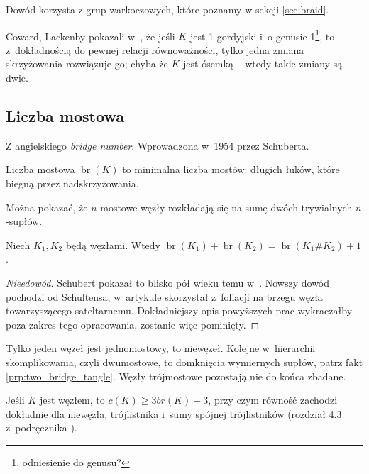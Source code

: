 Dowód korzysta z grup warkoczowych, które poznamy w sekcji \ref{sec:braid}.

\begin{conjecture}
\end{conjecture}

Coward, Lackenby pokazali w~\cite{coward11}, że jeśli $K$ jest 1-gordyjski i~o genusie 1\footnote{odniesienie do genusu?}, to z~dokładnością do pewnej relacji równoważności, tylko jedna zmiana skrzyżowania rozwiązuje go; chyba że $K$ jest ósemką -- wtedy takie zmiany są dwie.


\subsection{Liczba mostowa} %
\label{sub:bridge_index}
Z angielskiego \emph{bridge number}.
Wprowadzona w~1954 przez Schuberta.
\begin{definition}
    Liczba mostowa $\operatorname{br}(K)$ to minimalna liczba mostów:
    długich łuków, które biegną przez nadskrzyżowania.
\end{definition}

Można pokazać, że $n$-mostowe węzły rozkładają się na sumę dwóch trywialnych $n$-supłów.

\begin{proposition}
    Niech $K_1, K_2$ będą węzłami.
    Wtedy $\operatorname{br} (K_1) + \operatorname{br}(K_2) = \operatorname{br}(K_1 \# K_2) + 1$.
\end{proposition}

\begin{proof}[Nieedowód]
    Schubert pokazał to blisko pół wieku temu w~\cite{schubert54}.
    Nowszy dowód pochodzi od Schultensa, w~artykule \cite{schultens03} skorzystał z~foliacji na brzegu węzła towarzyszącego sateltarnemu.
    Dokładniejszy opis powyższych prac wykraczałby poza zakres tego opracowania, zostanie więc pominięty.
\end{proof}

Tylko jeden węzeł jest jednomostowy, to niewęzeł.
Kolejne w~hierarchii skomplikowania, czyli dwumostowe,
to domknięcia wymiernych supłów, patrz fakt \ref{prp:two_bridge_tangle}.
Węzły trójmostowe pozostają nie do końca zbadane.

\begin{conjecture}
    Jeśli $K$ jest węzłem, to $c(K) \ge 3 br(K) - 3$, przy czym równość zachodzi dokładnie dla niewęzła, trójlistnika i~sumy spójnej trójlistników (rozdział 4.3 z~podręcznika \cite{murasugi96}).
\end{conjecture}

